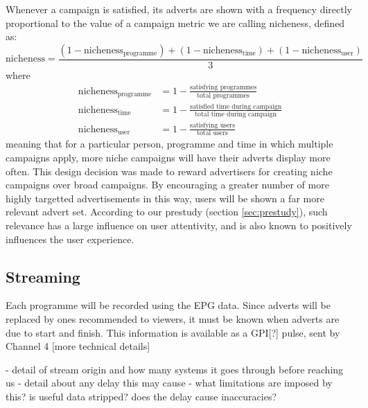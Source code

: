 Whenever a campaign is satisfied, its adverts are shown with a frequency directly proportional to the value of a campaign metric we are calling nicheness, defined as:
$$
	\text{nicheness} = \frac{(1-\text{nicheness}_\text{programme}) + (1-\text{nicheness}_\text{time}) + (1-\text{nicheness}_\text{user})}{3}
$$
where
\begin{align*}
	\text{nicheness}_\text{programme} &= 1 - \frac{\text{satisfying programmes}}{\text{total programmes}} \\
	\text{nicheness}_\text{time} &= 1 - \frac{\text{satisfied time during campaign}}{\text{total time during campaign}} \\
	\text{nicheness}_\text{user} &= 1 - \frac{\text{satisfying users}}{\text{total users}}
\end{align*}
meaning that for a particular person, programme and time in which multiple campaigns apply, more niche campaigns will have their adverts display more often. This design decision was made to reward advertisers for creating niche campaigns over broad campaigns. By encouraging a greater number of more highly targetted advertisements in this way, users will be shown a far more relevant advert set. According to our prestudy (section \ref{sec:prestudy}), such relevance has a large influence on user attentivity, and is also known to positively influences the user experience\cite{yahoo-intrusive-advertising}.

\subsection{Streaming}
Each programme will be recorded using the EPG data. Since adverts will be replaced by ones recommended to viewers, it must be known when adverts are due to start and finish. This information is available as a GPI[?] pulse, sent by Channel 4 [more technical details]

- detail of stream origin and how many systems it goes through before reaching us
- detail about any delay this may cause
- what limitations are imposed by this? is useful data stripped? does the delay cause inaccuracies?


